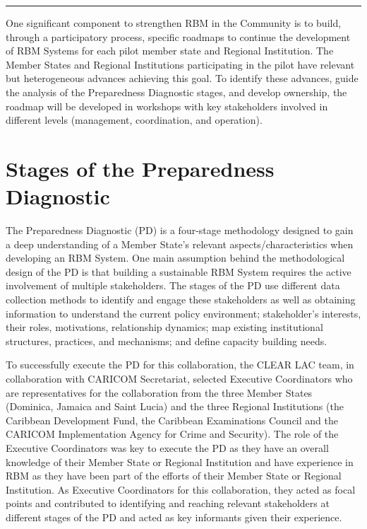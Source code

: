 \documentclass[
  10pt,
]{book}
\begin{document}
\begin{center}\rule{0.5\linewidth}{0.5pt}\end{center}

One significant component to strengthen RBM in the Community is to build, through a participatory process, specific roadmaps to continue the development of RBM Systems for each pilot member state and Regional Institution. The Member States and Regional Institutions participating in the pilot have relevant but heterogeneous advances achieving this goal. To identify these advances, guide the analysis of the Preparedness Diagnostic stages, and develop ownership, the roadmap will be developed in workshops with key stakeholders involved in different levels (management, coordination, and operation).

\hypertarget{stages-of-the-preparedness-diagnostic}{%
\section{Stages of the Preparedness Diagnostic}\label{stages-of-the-preparedness-diagnostic}}

The Preparedness Diagnostic (PD) is a four-stage methodology designed to gain a deep understanding of a Member State's relevant aspects/characteristics when developing an RBM System. One main assumption behind the methodological design of the PD is that building a sustainable RBM System requires the active involvement of multiple stakeholders. The stages of the PD use different data collection methods to identify and engage these stakeholders as well as obtaining information to understand the current policy environment; stakeholder's interests, their roles, motivations, relationship dynamics; map existing institutional structures, practices, and mechanisms; and define capacity building needs.

To successfully execute the PD for this collaboration, the CLEAR LAC team, in collaboration with CARICOM Secretariat, selected Executive Coordinators who are representatives for the collaboration from the three Member States (Dominica, Jamaica and Saint Lucia) and the three Regional Institutions (the Caribbean Development Fund, the Caribbean Examinations Council and the CARICOM Implementation Agency for Crime and Security). The role of the Executive Coordinators was key to execute the PD as they have an overall knowledge of their Member State or Regional Institution and have experience in RBM as they have been part of the efforts of their Member State or Regional Institution. As Executive Coordinators for this collaboration, they acted as focal points and contributed to identifying and reaching relevant stakeholders at different stages of the PD and acted as key informants given their experience.
\end{document}
